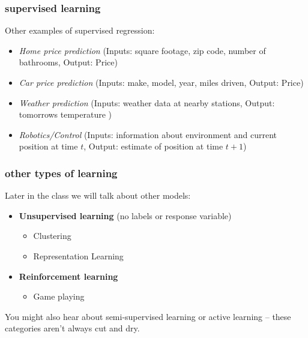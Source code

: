 \documentclass[handout,compress]{beamer}
\newcommand{\bv}[1]{\mathbf{#1}}
\begin{document}
\begin{frame}
	\frametitle{supervised learning}
	Other examples of supervised regression:
	\begin{itemize}
		\item \emph{Home price prediction} (Inputs: square footage, zip code, number of bathrooms, Output: Price)
		\item \emph{Car price prediction} (Inputs: make, model, year, miles driven, Output: Price)
		\item \emph{Weather prediction} (Inputs: weather data at nearby stations, Output: tomorrows temperature )
		\item \emph{Robotics/Control} (Inputs: information about environment and current position at time $t$, Output: estimate of position at time $t+1$)	
	\end{itemize}
\end{frame}

\begin{frame}
	\frametitle{other types of learning}
	Later in the class we will talk about other models: 
	\begin{itemize}
		\item \textbf{Unsupervised learning} (no labels or response variable)
		\begin{itemize}
			\item Clustering
			\item Representation Learning
		\end{itemize}
		\item \textbf{Reinforcement learning}
			\begin{itemize}
				\item Game playing
			\end{itemize}
	\end{itemize}
You might also hear about semi-supervised learning or active learning -- these categories aren't always cut and dry.
\end{frame}

\end{document}
